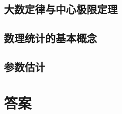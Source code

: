 \documentclass[lang=cn,math=mtpro2,11pt,scheme=chinese]{elegantbook}
\begin{document}
\section{大数定律与中心极限定理}

\section{数理统计的基本概念}

\section{参数估计}

\nocite{*}

\printbibliography[heading=bibintoc, title=\ebibname]
\appendix
\chapter{答案}
\end{document}
